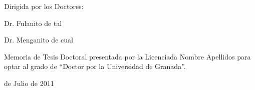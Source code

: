 \documentclass[b5paper,twoside,10pt]{book}
\begin{document}
\begin{minipage}[t]{.4\textwidth}
Dirigida por los Doctores:

\vspace{15ex}

Dr. Fulanito de tal

\vspace{15ex}

Dr. Menganito de cual

\end{minipage}
\hfill
\begin{minipage}[t]{.5\textwidth}
Memoria de Tesis Doctoral presentada por la Licenciada Nombre Apellidos  para optar al grado de ``Doctor por la Universidad de Granada''.

\vspace{29.7ex}

 de Julio de 2011

\end{minipage}


\newpage
\cleardoublepage
\thispagestyle{empty}
\end{document}

